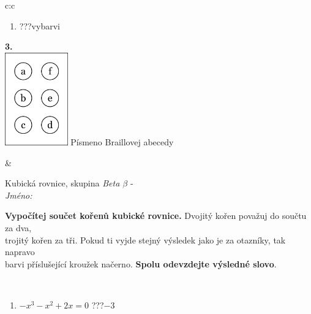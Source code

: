 \documentclass[10pt]{report}
\begin{document}
\begin{tabular}{c:c}
\begin{minipage}[c][104.5mm][t]{0.5\linewidth}
\begin{center}
\begin{minipage}{0.79\linewidth}
\begin{center}
\begin{varwidth}{\linewidth}
\begin{enumerate}
\item \quad \dotfill\; ???\;\dotfill \quad vybarvi
\end{enumerate}
\end{varwidth}
\end{center}
\end{minipage}
\begin{minipage}{0.20\linewidth}
\begin{center}
{\Huge\bfseries 3.} \\[2mm]
\includegraphics[height=40mm]{../images/braille.png}
{\small Písmeno Braillovej abecedy}
\end{center}
\end{minipage}
\end{center}
\end{minipage}
&
\begin{minipage}[c][104.5mm][t]{0.5\linewidth}
\begin{center}
\vspace{7mm}
{\huge Kubická rovnice, skupina \textit{Beta $\beta$} -}\\[5mm]
\textit{Jméno:}\phantom{xxxxxxxxxxxxxxxxxxxxxxxxxxxxxxxxxxxxxxxxxxxxxxxxxxxxxxxxxxxxxxxxx}\\[5mm]
\begin{minipage}{0.95\linewidth}
\begin{center}
\textbf{Vypočítej součet kořenů kubické rovnice.} Dvojitý kořen považuj do součtu za dva,\\trojitý kořen za tři. Pokud ti vyjde stejný výsledek jako je za otazníky, tak napravo\\barvi příslušející kroužek načerno. \textbf{Spolu odevzdejte výsledné slovo}.
\end{center}
\end{minipage}
\\[1mm]
\begin{minipage}{0.79\linewidth}
\begin{center}
\begin{varwidth}{\linewidth}
\begin{enumerate}
\Large
\item $-x^3-x^2+2x=0$\quad \dotfill\; ???\;\dotfill \quad $-3$

\end{enumerate}
\end{varwidth}
\end{center}
\end{minipage}
\end{center}
\end{minipage}
\end{tabular}
\end{document}
